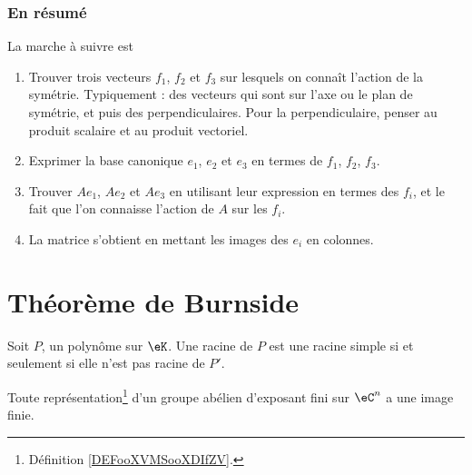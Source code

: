 \subsubsection{En résumé}
La marche à suivre est

\begin{enumerate}

	\item
	      Trouver trois vecteurs \( f_1\), \( f_2\) et \( f_3\) sur lesquels on connaît l'action de la symétrie. Typiquement : des vecteurs qui sont sur l'axe ou le plan de symétrie, et puis des perpendiculaires. Pour la perpendiculaire, penser au produit scalaire et au produit vectoriel.

	\item
	      Exprimer la base canonique \( e_1\), \( e_2\) et \( e_3\) en termes de \( f_1\), \( f_2\), \( f_3\).

	\item
	      Trouver \( Ae_1\), \( Ae_2\) et \( Ae_3\) en utilisant leur expression en termes des \( f_i\), et le fait que l'on connaisse l'action de \( A\) sur les \( f_i\).

	\item
	      La matrice s'obtient en mettant les images des \( e_i\) en colonnes.
\end{enumerate}

\section{Théorème de Burnside}

\begin{lemma}       \label{LemwXXzIt}
	Soit \( P\), un polynôme sur \( \eK\). Une racine de \( P\) est une racine simple si et seulement si elle n'est pas racine de \( P'\).
\end{lemma}

\begin{theorem}     \label{ThoBurnsideoPuCtS}
	Toute représentation\footnote{Définition \ref{DEFooXVMSooXDIfZV}.} d'un groupe abélien d'exposant fini sur \( \eC^n\) a une image finie.
\end{theorem}

